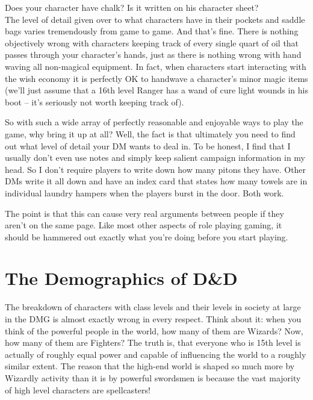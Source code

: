 Does your character have chalk? Is it written on his character sheet?\\

The level of detail given over to what characters have in their pockets and saddle bags varies tremendously from game to game. And that's fine. There is nothing objectively wrong with characters keeping track of every single quart of oil that passes through your character's hands, just as there is nothing wrong with hand waving all non-magical equipment. In fact, when characters start interacting with the wish economy it is perfectly OK to handwave a character's minor magic items (we'll just assume that a 16th level Ranger has a wand of cure light wounds in his boot -- it's seriously not worth keeping track of).

So with such a wide array of perfectly reasonable and enjoyable ways to play the game, why bring it up at all? Well, the fact is that ultimately you need to find out what level of detail your DM wants to deal in. To be honest, I find that I usually don't even use notes and simply keep salient campaign information in my head. So I don't require players to write down how many pitons they have. Other DMs write it all down and have an index card that states how many towels are in individual laundry hampers when the players burst in the door. Both work.

The point is that this can cause very real arguments between people if they aren't on the same page. Like most other aspects of role playing gaming, it should be hammered out exactly what you're doing before you start playing.

\section{The Demographics of D\&D}
\vspace*{-8pt}

The breakdown of characters with class levels and their levels in society at large in the DMG is almost exactly wrong in every respect. Think about it: when you think of the powerful people in the world, how many of them are Wizards? Now, how many of them are Fighters? The truth is, that everyone who is 15th level is actually of roughly equal power and capable of influencing the world to a roughly similar extent. The reason that the high-end world is shaped so much more by Wizardly activity than it is by powerful swordsmen is because the vast majority of high level characters are spellcasters!

